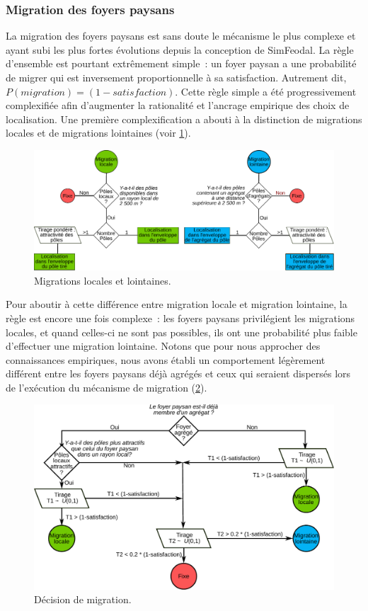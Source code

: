 	\subsubsection{Migration des foyers paysans \label{sssec:migration}}

La migration des foyers paysans est sans doute le mécanisme le plus complexe et ayant subi les plus fortes évolutions depuis la conception de SimFeodal.
La règle d'ensemble est pourtant extrêmement simple : un foyer paysan a une probabilité de migrer qui est inversement proportionnelle à sa satisfaction. 
Autrement dit, $P \left( migration \right) = \left( 1 - satisfaction \right)$.
Cette règle simple a été progressivement complexifiée afin d'augmenter la rationalité et l'ancrage empirique des choix de localisation.
Une première complexification a abouti à la distinction de migrations \og locales\fg{} et de migrations \og lointaines\fg{} (voir \cref{fig:migrations-locales-lointaines}).

\begin{figure}[H]
\centering
\includegraphics[width=1\linewidth]{img/migration_locale-lointaine.pdf}
\caption{Migrations locales et lointaines.}
\label{fig:migrations-locales-lointaines}
\end{figure}
Pour aboutir à cette différence entre migration locale et migration lointaine, la règle est encore une fois complexe : les foyers paysans privilégient les migrations locales, et quand celles-ci ne sont pas possibles, ils ont une probabilité plus faible d'effectuer une migration lointaine.
Notons que pour nous approcher des connaissances empiriques, nous avons établi un comportement légèrement différent entre les foyers paysans déjà agrégés et ceux qui seraient dispersés lors de l'exécution du mécanisme de migration (\cref{fig:choix-migration}).
\begin{figure}[H]
	\centering
	\includegraphics[width=0.9\linewidth]{img/choix_migration.pdf}
	\caption{Décision de migration.}
	\label{fig:choix-migration}
\end{figure}

